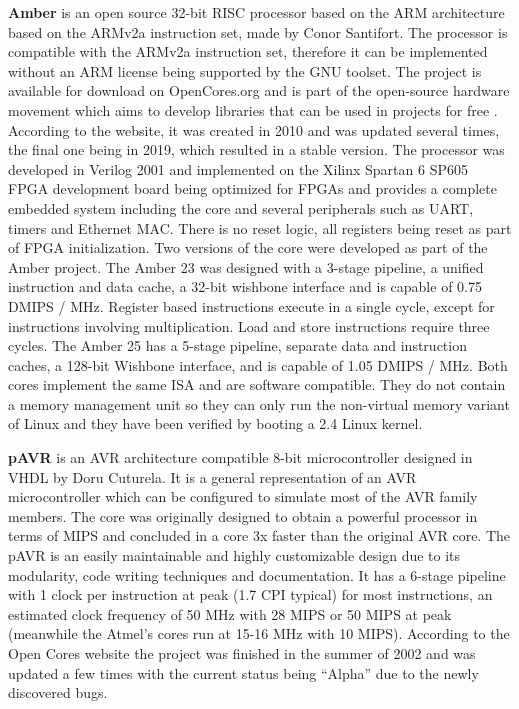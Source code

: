 \hspace{0.5cm} \textbf{Amber} is an open source 32-bit RISC processor based on the ARM architecture based on the ARMv2a instruction set, made by Conor Santifort. The processor is compatible with the
ARMv2a instruction set, therefore it can be implemented without an ARM license being
supported by the GNU toolset. The project is available for download on OpenCores.org and
is part of the open-source hardware movement which aims to develop libraries that can be
used in projects for free \cite{3}. According to the website, it was created in 2010 and was
updated several times, the final one being in 2019, which resulted in a stable version. The
processor was developed in Verilog 2001 and implemented on the Xilinx Spartan 6 SP605
FPGA development board being optimized for FPGAs and provides a complete embedded
system including the core and several peripherals such as UART, timers and Ethernet MAC.
There is no reset logic, all registers being reset as part of FPGA initialization. Two versions
of the core were developed as part of the Amber project. The Amber 23 was designed with a
3-stage pipeline, a unified instruction and data cache, a 32-bit wishbone interface and is
capable of 0.75 DMIPS / MHz. Register based instructions execute in a single cycle, except
for instructions involving multiplication. Load and store instructions require three cycles. The
Amber 25 has a 5-stage pipeline, separate data and instruction caches, a 128-bit Wishbone
interface, and is capable of 1.05 DMIPS / MHz. Both cores implement the same ISA and are
software compatible. They do not contain a memory management unit so they can only run
the non-virtual memory variant of Linux and they have been verified by booting a 2.4 Linux
kernel. \cite{3}\cite{6}

\hspace{0.5cm} \textbf{pAVR} is an AVR architecture compatible 8-bit microcontroller designed in VHDL by
Doru Cuturela. It is a general representation of an AVR microcontroller which can be
configured to simulate most of the AVR family members. The core was originally designed
to obtain a powerful processor in terms of MIPS and concluded in a core 3x faster than the
original AVR core. The pAVR is an easily maintainable and highly customizable design due
to its modularity, code writing techniques and documentation. It has a 6-stage pipeline with 1
clock per instruction at peak (1.7 CPI typical) for most instructions, an estimated clock
frequency of 50 MHz with 28 MIPS or 50 MIPS at peak (meanwhile the Atmel’s cores run at
15-16 MHz with 10 MIPS). According to the Open Cores website the project was finished in
the summer of 2002 and was updated a few times with the current status being “Alpha” due
to the newly discovered bugs. \cite{7}

